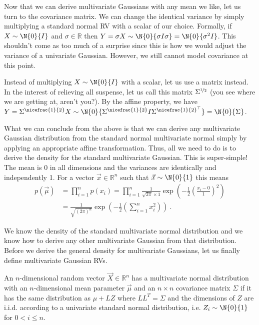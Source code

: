 Now that we can derive multivariate Gaussians with any mean we like, let us turn to the covariance matrix. We can change the identical variance by simply multiplying
a standard normal RV with a scalar of our choice. Formally, if $ X \sim \N{0}{I} $ and $ \sigma \in \mathbb{R} $ then 
$ Y = \sigma X \sim \N{0} {\sigma I \sigma} = \N{0} {\sigma^{2}I} $. This shouldn't come as too much of a surprise since this is how we would adjust 
the variance of a univariate Gaussian. However, we still cannot model covariance at this point. 

Instead of multiplying $ X \sim \N{0}{I} $ with a scalar, let us use a matrix instead. In the interest of relieving all suspense, let us call this matrix $ \Sigma^{\nicefrac{1}{2}} $
(you see where we are getting at, aren't you?). By the affine property, we have 
$ Y = \Sigma^{\nicefrac{1}{2}} X \sim \N{0}{\Sigma^{\nicefrac{1}{2}} I \Sigma^{\nicefrac{1}{2}^{\top}}} = \N{0}{\Sigma} $. 

What we can conclude from the above is that we can derive any multivariate Gaussian distribution from the standard normal multivariate normal simply by applying an
appropriate affine transformation. Thus, all we need to do is to derive the density for the standard multivariate Gaussian. This is super-simple! The mean is $ 0 $
in all dimensions and the variances are identically and independently 1. For a vector $ \vec{x} \in \mathbb{R}^{n} $ such that $ \vec{x} \sim \N{0}{1} $ this means
\begin{align}\label{eq:mvstandardNormal}
p(\vec{\mu}) &= \prod_{i=1}^{n} p(x_{i}) = \prod_{i=1}^{n} \frac{1}{\sqrt{2\pi} \times 1} \exp \left(-\frac{1}{2}\left( \frac{x_{i} - 0}{1} \right)^{2} \right) \\
&= \frac{1}{\sqrt{(2\pi)^{n}}} \exp \left(-\frac{1}{2}\left( \sum_{i=1}^{n}x_{i}^{2} \right) \right) \ . \nonumber
\end{align}

We know the density of the standard multivariate normal distribution and we know how to derive any other multivariate Gaussian from that distribution. Before
we derive the general density for multivariate Gaussians, let us finally define multivariate Gaussian RVs.
\begin{Definition}
An $ n $-dimensional random vector $ \vec{X} \in \mathbb{R}^{n} $ has a multivariate normal distribution with an $ n $-dimensional mean parameter 
$ \vec{\mu} $ and an $ n \times n $ covariance matrix $ \Sigma $ if it has the same distribution as $ \mu + LZ $ where $ LL^{T} = \Sigma $ and 
the dimensions of $ Z $ are i.i.d. according to a univariate standard normal distribution, i.e. $ Z_{i} \sim \N{0}{1} $ for $ 0 < i \leq n $.
\end{Definition}

